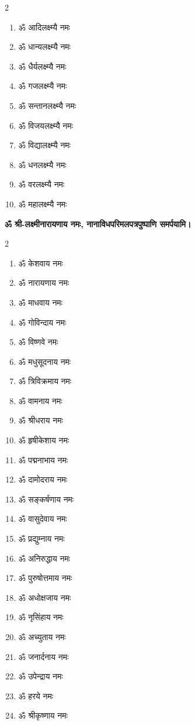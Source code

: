 \begin{center}
\begin{multicols}{2}
\begin{enumerate}
\item ॐ आदिलक्ष्म्यै नमः
\item ॐ धान्यलक्ष्म्यै नमः
\item ॐ धैर्यलक्ष्म्यै नमः
\item ॐ गजलक्ष्म्यै नमः
\item ॐ सन्तानलक्ष्म्यै नमः
\item ॐ विजयलक्ष्म्यै नमः
\item ॐ विद्यालक्ष्म्यै नमः
\item ॐ धनलक्ष्म्यै नमः
\item ॐ वरलक्ष्म्यै नमः
\item ॐ महालक्ष्म्यै नमः
\end{enumerate}
\end{multicols}

\textbf{ॐ श्री-लक्ष्मीनारायणाय नमः, नानाविधपरिमलपत्रपुष्पाणि समर्पयामि।} \medskip


\begin{multicols}{2}
\begin{enumerate}
\item ॐ केशवाय नमः
\item ॐ नारायणाय नमः
\item ॐ माधवाय नमः
\item ॐ गोविन्दाय नमः
\item ॐ विष्णवे नमः
\item ॐ मधुसूदनाय नमः
\item ॐ त्रिविक्रमाय नमः
\item ॐ वामनाय नमः
\item ॐ श्रीधराय नमः
\item ॐ हृषीकेशाय नमः
\item ॐ पद्मनाभाय नमः
\item ॐ दामोदराय नमः
\item ॐ सङ्कर्षणाय नमः
\item ॐ वासुदेवाय नमः
\item ॐ प्रद्युम्नाय नमः
\item ॐ अनिरुद्धाय नमः
\item ॐ पुरुषोत्तमाय नमः
\item ॐ अधोक्षजाय नमः
\item ॐ नृसिंहाय नमः
\item ॐ अच्युताय नमः
\item ॐ जनार्दनाय नमः
\item ॐ उपेन्द्राय नमः
\item ॐ हरये नमः
\item ॐ श्रीकृष्णाय नमः
\end{enumerate}
\end{multicols}


\end{center}
